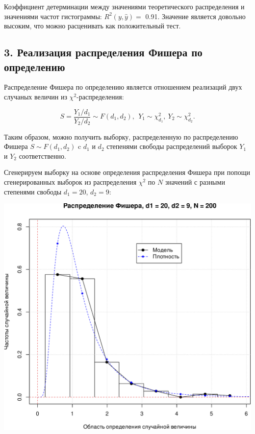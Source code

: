 \documentclass[
]{article}
\begin{document}
Коэффициент детерминации между значениями теоретического распределения и
значениями частот гистограммы: \(R^2(y, \hat{y}) =\) 0.91. Значение
является довольно высоким, что можно расценивать как положительный тест.

\hypertarget{ux440ux435ux430ux43bux438ux437ux430ux446ux438ux44f-ux440ux430ux441ux43fux440ux435ux434ux435ux43bux435ux43dux438ux44f-ux444ux438ux448ux435ux440ux430-ux43fux43e-ux43eux43fux440ux435ux434ux435ux43bux435ux43dux438ux44e}{%
\subsection{\texorpdfstring{\textbf{3. Реализация распределения Фишера
по
определению}}{3. Реализация распределения Фишера по определению}}\label{ux440ux435ux430ux43bux438ux437ux430ux446ux438ux44f-ux440ux430ux441ux43fux440ux435ux434ux435ux43bux435ux43dux438ux44f-ux444ux438ux448ux435ux440ux430-ux43fux43e-ux43eux43fux440ux435ux434ux435ux43bux435ux43dux438ux44e}}

Распределение Фишера по определению является отношением реализаций двух
случаных величин из \(\chi^2\)-распределения:

\[
S = \frac{Y_1/d_1}{Y_2/d_2} \sim F(d_1, d_2),\ \ Y_1 \sim \chi_{d_1}^2, \ Y_2 \sim \chi_{d_2}^2.
\]

Таким образом, можно получить выборку, распределенную по распределению
Фишера \(S \sim F(d_1, d_2)\) c \(d_1\) и \(d_2\) степенями свободы
распределений выборок \(Y_1\) и \(Y_2\) соответственно.

Сгенерируем выборку на основе определения распределения Фишера при
попощи сгенерированных выборок из распределения \(\chi^2\) по \(N\)
значений с разными степенями свободы \(d_1 = 20\), \(d_2 = 9\):

\begin{center}\includegraphics[width=0.6\linewidth]{Prac4_files/figure-latex/unnamed-chunk-7-1} \end{center}
\end{document}

